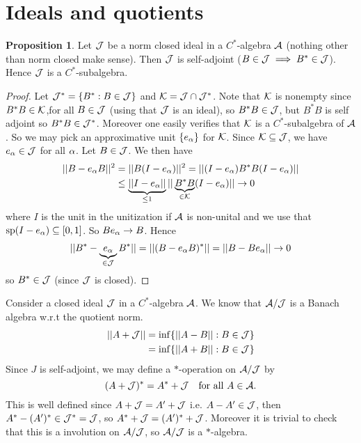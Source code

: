 \documentclass[10pt,english,a4paper]{article}
\theoremstyle{definition}
\newtheorem*{proposition}{Proposition}
\DeclareMathOperator{\Sp}{sp}
\begin{document}
\section{Ideals and quotients}
\begin{proposition}
    Let $\mathcal{J}$ be a norm closed ideal in a $C^*$-algebra $\mathcal{A}$ (nothing other than norm closed make sense). Then $\mathcal{J}$ is self-adjoint ($B \in \mathcal{J} \implies B^* \in \mathcal{J}$). 
Hence $\mathcal{J}$ is a $C^*$-subalgebra. 
\end{proposition}
\begin{proof}
    Let $\mathcal{J}^* = \{B^* : B \in \mathcal{J}\}$ and $\mathcal{K} = \mathcal{J}\cap \mathcal{J}^*$. Note that 
    $\mathcal{K}$ is nonempty since $B^*B \in \mathcal{K}$,for all $B\in \mathcal{J}$ (using that $\mathcal{J}$ is an ideal),
so $B^*B \in \mathcal{J}$, but $B^*B$ is self adjoint so $B^*B \in \mathcal{J}^*$.
Moreover one easily verifies that $\mathcal{K}$ is a $C^*$-subalgebra of $\mathcal{A}$.
So we may pick an approximative unit $\{e_{\alpha}\}$ for $\mathcal{K}$. Since 
$\mathcal{K} \subseteq \mathcal{J}$, we have $e_{\alpha} \in \mathcal{J}$ for all $\alpha$. Let 
$B \in \mathcal{J}$. We then have 
\begin{align*}
    ||B-e_{\alpha}B||^2 &=
    ||B(I-e_{\alpha})||^2 = ||(I-e_{\alpha}) B^*B (I - e_{\alpha})|| \\
    &\leq \underbrace{||I-e_{\alpha}||}_{\leq 1} ||\underbrace{B^*B}_{\in \mathcal{K}}(I-e_{\alpha})|| \to 0
\end{align*}
where $I$ is the unit in the unitization if $\mathcal{A}$ is non-unital and we use that 
$\Sp(I-e_{\al})\subseteq [0,1]$. So $Be_{\alpha} \to B$.
Hence
\begin{align*}
||B^* - \underbrace{e_{\alpha}}_{\in \mathcal{J}}B^* || = ||(B-e_{\alpha}B)^* ||   = ||B-Be_{\alpha}|| \to 0 
\end{align*}
so $B^* \in \mathcal{J}$ (since $\mathcal{J}$ is closed).
\end{proof}


Consider a closed ideal $\mathcal{J}$ in a $C^*$-algebra $\mathcal{A}$. We know that $\mathcal{A}/\mathcal{J}$
is a Banach algebra w.r.t the quotient norm.
\begin{align*}
    ||A+\mathcal{J}|| &= \inf\{ ||A-B|| : B\in \mathcal{J} \} \\
              &= \inf\{ ||A+B|| : B\in \mathcal{J} \}
\end{align*}
Since $J$ is self-adjoint, we may define a $*$-operation on $\mathcal{A}/\mathcal{J}$ by
\[ (A + \mathcal{J})^* = A^* + \mathcal{J} \quad \text{for all } A \in \mathcal{A}.\]
This is well defined since 
$A +\mathcal{J} = A' + \mathcal{J}$ i.e. $A-A' \in \mathcal{J}$, then 
$A^* - (A')^* \in \mathcal{J}^* = \mathcal{J}$, so $A^* + \mathcal{J} = (A')^* + \mathcal{J}$.
Moreover it is trivial to check that this is a involution on 
$\mathcal{A}/\mathcal{J}$, so $\mathcal{A}/\mathcal{J}$ is a $*$-algebra.
\end{document}
